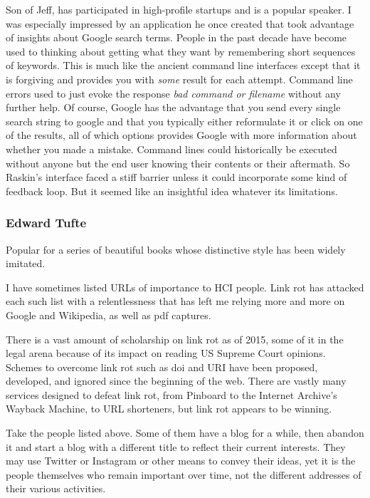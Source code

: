 Son of Jeff, has participated in high-profile startups and is a popular
speaker. I was especially impressed by an application he once created
that took advantage of insights about Google search terms. People in the
past decade have become used to thinking about getting what they want by
remembering short sequences of keywords. This is much like the ancient
command line interfaces except that it is forgiving and provides you
with \emph{some} result for each attempt. Command line errors used to
just evoke the response \emph{bad command or filename} without any
further help. Of course, Google has the advantage that you send every
single search string to google and that you typically either reformulate
it or click on one of the results, all of which options provides Google
with more information about whether you made a mistake. Command lines
could historically be executed without anyone but the end user knowing
their contents or their aftermath. So Raskin's interface faced a stiff
barrier unless it could incorporate some kind of feedback loop. But it
seemed like an insightful idea whatever its limitations.

\hypertarget{edward-tufte}{%
\subsubsection{Edward Tufte}\label{edward-tufte}}

Popular for a series of beautiful books whose distinctive style has been
widely imitated.

\hypertarget{urls}{%
\label{urls}}

I have sometimes listed URLs of importance to HCI people. Link rot has
attacked each such list with a relentlessness that has left me relying
more and more on Google and Wikipedia, as well as pdf captures.

There is a vast amount of scholarship on link rot as of 2015, some of it
in the legal arena because of its impact on reading US Supreme Court
opinions. Schemes to overcome link rot such as doi and URI have been
proposed, developed, and ignored since the beginning of the web. There
are vastly many services designed to defeat link rot, from Pinboard to
the Internet Archive's Wayback Machine, to URL shorteners, but link rot
appears to be winning.

Take the people listed above. Some of them have a blog for a while, then
abandon it and start a blog with a different title to reflect their
current interests. They may use Twitter or Instagram or other means to
convey their ideas, yet it is the people themselves who remain important
over time, not the different addresses of their various activities.

